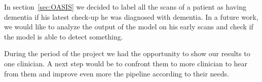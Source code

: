In section~\ref{sec:OASIS} we decided to label all the scans of a patient as having dementia if his latest check-up he was diagnosed with dementia. In a future work, we would like to analyze the output of the model on his early scans and check if the model is able to detect something.

During the period of the project we had the opportunity to show our results to one clinician. A next step would be to confront them to more clinician to hear from them and improve even more the pipeline according to their needs.

